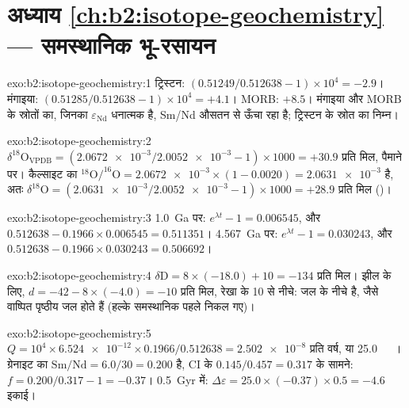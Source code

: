 \section*{अध्याय \ref{ch:b2:isotope-geochemistry} --- समस्थानिक भू-रसायन}

\begin{solution}{exo:b2:isotope-geochemistry:1}
ट्रिस्टन: $(0.51249/0.512638 - 1)\times10^4 = -2.9$। मंगाइया: $(0.51285/0.512638 -
1)\times10^4 = +4.1$। MORB: $+8.5$। मंगाइया और MORB के स्रोतों का, जिनका
$\varepsilon_{\mathrm{Nd}}$ धनात्मक है, Sm/Nd औसतन  से ऊँचा रहा है;
ट्रिस्टन के स्रोत का निम्न।
\end{solution}

\begin{solution}{exo:b2:isotope-geochemistry:2}
$\delta^{18}\mathrm{O}_{\mathrm{VPDB}} = (\num{2.0672e-3}/\num{2.0052e-3} - 1)\times1000 =
+30.9$ प्रति मिल,  पैमाने पर। कैल्साइट का $^{18}\mathrm{O}/^{16}\mathrm{O} =
\num{2.0672e-3}\times(1 - 0.0020) = \num{2.0631e-3}$ है, अतः $\delta^{18}\mathrm{O} =
(\num{2.0631e-3}/\num{2.0052e-3} - 1)\times1000 = +28.9$ प्रति मिल ()।
\end{solution}

\begin{solution}{exo:b2:isotope-geochemistry:3}
\qty{1.0}{Ga} पर: $e^{\lambda t} - 1 = 0.006545$, और $0.512638 - 0.1966\times0.006545 =
0.511351$। \qty{4.567}{Ga} पर: $e^{\lambda t}-1 = 0.030243$, और $0.512638 -
0.1966\times0.030243 = 0.506692$।
\end{solution}

\begin{solution}{exo:b2:isotope-geochemistry:4}
$\delta\mathrm{D} = 8\times(-18.0) + 10 = -134$ प्रति मिल। झील के लिए, $d = -42 -
8\times(-4.0) = -10$ प्रति मिल, रेखा के 10 से नीचे: जल  के नीचे है, जैसे वाष्पित पृष्ठीय जल होते हैं (हल्के समस्थानिक पहले निकल गए)।
\end{solution}

\begin{solution}{exo:b2:isotope-geochemistry:5}
$Q = 10^4\times\num{6.524e-12}\times0.1966/0.512638 = \num{2.502e-8}$ प्रति वर्ष, या
\qty{25.0}{\per\giga\year}। ग्रेनाइट का $\mathrm{Sm}/\mathrm{Nd} = 6.0/30 = 0.200$ है,
CI के $0.145/0.457 = 0.317$ के सामने: $f = 0.200/0.317 - 1 = -0.37$।
\qty{0.5}{Gyr} में: $\Delta\varepsilon = 25.0\times(-0.37)\times0.5 = -4.6$ इकाई।
\end{solution}

